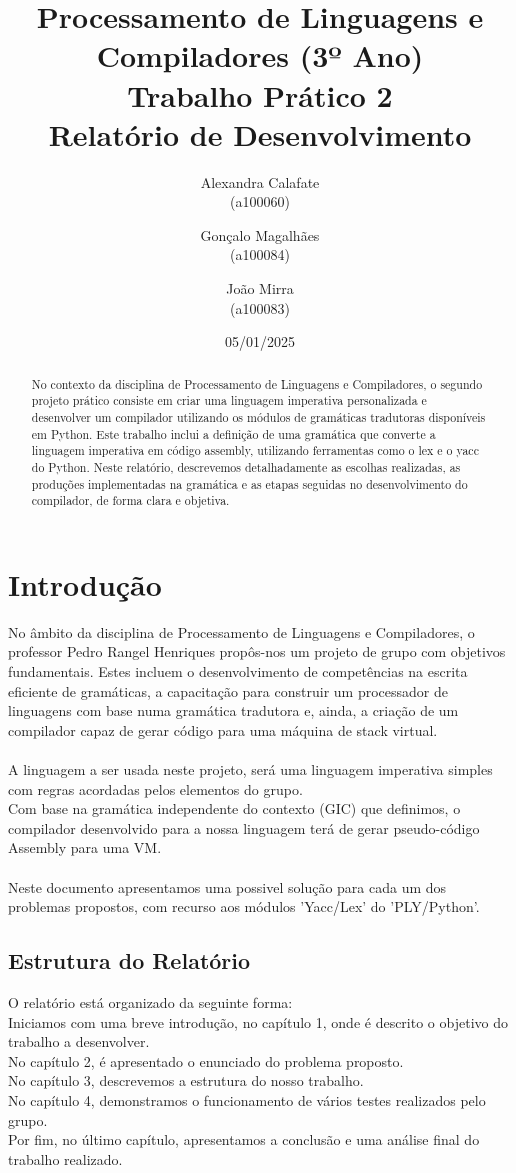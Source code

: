 \documentclass[11pt,a4paper]{report}
\title{Processamento de Linguagens e Compiladores (3º Ano)\\
       \textbf{Trabalho Prático 2}\\ Relatório de Desenvolvimento
       }
\author{Alexandra Calafate\\ (a100060) \and Gonçalo Magalhães\\ (a100084)
         \and João Mirra\\ (a100083)
       }
\date{05/01/2025}
\begin{document}
\maketitle %

\begin{abstract}
No contexto da disciplina de Processamento de Linguagens e Compiladores, o segundo projeto prático consiste em criar uma linguagem imperativa personalizada e desenvolver um compilador utilizando os módulos de gramáticas tradutoras disponíveis em Python. Este trabalho inclui a definição de uma gramática que converte a linguagem imperativa em código assembly, utilizando ferramentas como o lex e o yacc do Python. Neste relatório, descrevemos detalhadamente as escolhas realizadas, as produções implementadas na gramática e as etapas seguidas no desenvolvimento do compilador, de forma clara e objetiva.
\end{abstract}

\tableofcontents

\chapter{Introdução} \label{chap:intro} %
No âmbito da disciplina de Processamento de Linguagens e Compiladores, o professor Pedro Rangel Henriques propôs-nos um projeto de grupo com objetivos fundamentais. Estes incluem o desenvolvimento de competências na escrita eficiente de gramáticas, a capacitação para construir um processador de linguagens com base numa gramática tradutora e, ainda, a criação de um compilador capaz de gerar código para uma máquina de stack virtual.
\\
\\
A linguagem a ser usada neste projeto, será uma linguagem imperativa simples com regras acordadas pelos elementos do grupo. 
\\
Com base na gramática independente do contexto (GIC) que definimos, o compilador desenvolvido para a nossa linguagem terá de gerar pseudo-código Assembly para uma VM.
\\
\\
Neste documento apresentamos uma possivel solução para cada um dos problemas propostos, com recurso aos módulos 'Yacc/Lex' do 'PLY/Python'.

\newpage

\section*{Estrutura do Relatório}
O relatório está organizado da seguinte forma:\\
Iniciamos com uma breve introdução, no capítulo 1, onde é descrito o objetivo do trabalho a desenvolver.\\
No capítulo 2, é apresentado o enunciado do problema proposto.\\
No capítulo 3, descrevemos a estrutura do nosso trabalho.\\
No capítulo 4, demonstramos o funcionamento de vários testes realizados pelo grupo.\\
Por fim, no último capítulo, apresentamos a conclusão e uma análise final do trabalho realizado.
\end{document}
